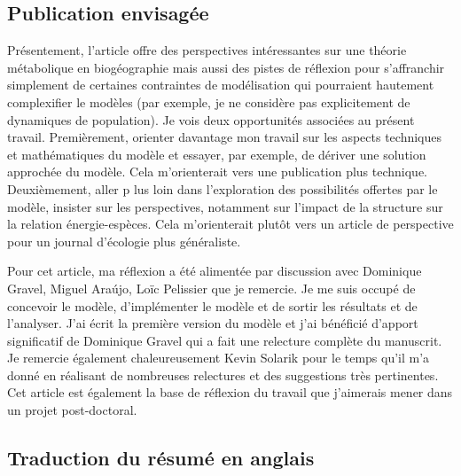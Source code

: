 \subsection{Publication envisagée}

Présentement, l'article offre des perspectives intéressantes sur une
théorie métabolique en biogéographie mais aussi des pistes de réflexion
pour s'affranchir simplement de certaines contraintes de modélisation
qui pourraient hautement complexifier le modèles (par exemple, je ne considère
pas explicitement de dynamiques de population). Je vois deux opportunités
associées au présent travail. Premièrement, orienter davantage mon travail
sur les aspects techniques et mathématiques du modèle et essayer,
par exemple, de dériver une solution approchée du modèle.
Cela m'orienterait vers une publication plus technique. Deuxièmement, aller p
lus loin dans l'exploration des possibilités offertes par le modèle, insister
sur les perspectives, notamment sur l'impact de la structure sur la relation
énergie-espèces. Cela m'orienterait plutôt vers
un article de perspective pour un journal d’écologie plus généraliste.

Pour cet article, ma réflexion a été alimentée par discussion avec Dominique Gravel,
Miguel Araújo, Loïc Pelissier que je remercie. Je me suis occupé de concevoir le modèle,
d'implémenter le modèle et de sortir les résultats et de l'analyser.
J'ai écrit la première version du modèle et j'ai bénéficié d'apport significatif
de Dominique Gravel qui a fait une relecture complète du manuscrit. Je remercie
également chaleureusement Kevin Solarik pour le temps qu'il m'a donné en
réalisant de nombreuses relectures et des suggestions très pertinentes.
Cet article est également la base de réflexion du travail que
j’aimerais mener dans un projet post-doctoral.


\subsection{Traduction du résumé en anglais}

